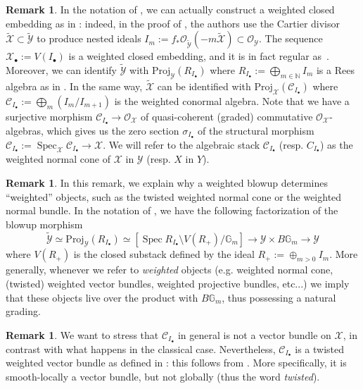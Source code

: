 \documentclass[12pt]{amsart}
\newcommand\spec{\operatorname{Spec}}
\newcommand\G{\mathbb{G}}
\newcommand\Gm{\mathbb{G}_m}
\newcommand\Proj{\text{Proj}}
\newcommand{\bN}{\mathbb{N}}
\newcommand{\sC}{\mathscr{C}}
\newcommand{\sO}{\mathscr{O}}
\newcommand{\cC}{\mathcal{C}}
\newcommand{\cX}{\mathcal{X}}
\newcommand{\cY}{\mathcal{Y}}
\newcommand{\tcY}{\widetilde{\mathcal{Y}}}
\theoremstyle{definition}
\newtheorem{Rmk}[theorem]{Remark}
\begin{document}
\begin{Rmk}\label{rem:def-weighted-closed-embedding}
    In the notation of , we can actually construct a weighted closed embedding as in \cite[Definition 4.1.1]{quek-rydh-weighted-blowup}: indeed, in the proof of \cite[Proposition 2.18]{italians}, the authors use the Cartier divisor $\widetilde{\cX}\subset\widetilde{\cY}$ to produce nested ideals $I_m:=f_*\sO_{\widetilde{\cY}}(-m\widetilde{\cX})\subset\sO_{\cY}$. The sequence $\cX_{\bullet}:=V(I_{\bullet})$ is a weighted closed embedding, and it is in fact regular as~\cite[Definition 5.1.3]{quek-rydh-weighted-blowup}. Moreover, we can identify $\widetilde{\cY}$ with $\Proj_{\cY} (R_{I_{\bullet}})$ where $R_{I_{\bullet}}:=\bigoplus_{m \in \bN} I_m$ is a Rees algebra as in \cite[Definition 3.1.1]{quek-rydh-weighted-blowup}. In the same way, $\widetilde{\cX}$ can be identified with $\Proj_{\cX}(\sC_{I_{\bullet}})$ where $\sC_{I_{\bullet}}:=\bigoplus_{m} (I_m/I_{m+1})$ is the weighted conormal algebra. Note that we have a surjective morphism $\sC_{I_{\bullet}} \rightarrow\sO_{\cX}$ of quasi-coherent (graded) commutative $\sO_{\cX}$-algebras, which gives us the zero section $\sigma_{I_{\bullet}}$ of the structural morphism $\cC_{I_{\bullet}}:=\spec_{\cX}\sC_{I_{\bullet}} \rightarrow\cX$. We will refer to the algebraic stack $\cC_{I_{\bullet}}$ (resp. $C_{I_\bullet}$) as the weighted normal cone of $\cX$ in $\cY$ (resp. $X$ in $Y$).
\end{Rmk}

\begin{Rmk}\label{rem:natural-grading}
    In this remark, we explain why a weighted blowup determines ``weighted'' objects, such as the twisted weighted normal cone or the weighted normal bundle. In the notation of , we have the following factorization of the blowup morphism
    $$ \tcY \simeq \Proj_{\cY}(R_{I_{\bullet}})\simeq \left[ \spec R_{I_{\bullet}} \setminus V(R_+)/\Gm \right] \rightarrow \cY \times B \G_m \rightarrow \cY$$
    where $V(R_+)$ is the closed substack defined by the ideal $R_+:=\oplus_{m>0}I_m$. More generally, whenever we refer to \emph{weighted} objects (e.g. weighted normal cone, (twisted) weighted vector bundles, weighted projective bundles, etc...) we imply that these objects live over the product with $B\Gm$, thus possessing a natural grading. 
\end{Rmk}

\begin{Rmk}\label{rem:twisted-weighted}
    We want to stress that $\cC_{I_{\bullet}}$ in general is not a vector bundle on $\cX$, in contrast with what happens in the classical case. Nevertheless, $\cC_{I_{\bullet}}$ is a twisted weighted vector bundle as defined in \cite[Definition 2.1.3]{quek-rydh-weighted-blowup}: this follows from \cite[Proposition 5.1.4]{quek-rydh-weighted-blowup}. More specifically, it is smooth-locally a vector bundle, but not globally (thus the word \emph{twisted}).
\end{Rmk}
\end{document}
